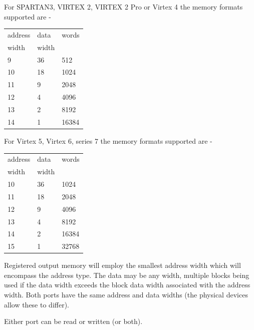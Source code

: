                 For SPARTAN3, VIRTEX 2, VIRTEX 2 Pro or Virtex 4 the memory formats
                supported are -

                \begin{tabular}{| l | l | l |}
                \hline
                address & data & words\\
                width & width & \\
                \hline \hline
                9  & 36 & 512   \\ \hline
                10 & 18 & 1024  \\ \hline
                11 & 9  & 2048  \\ \hline
                12 & 4  & 4096  \\ \hline
                13 & 2  & 8192  \\ \hline
                14 & 1  & 16384 \\ \hline
                \end{tabular}

                For Virtex 5, Virtex 6, series 7 the memory formats supported are -

                \begin{tabular}{| l | l | l |}
                \hline
                address & data & words\\
                width & width & \\
                \hline \hline
                10 & 36 & 1024  \\ \hline
                11 & 18 & 2048  \\ \hline
                12 & 9  & 4096  \\ \hline
                13 & 4  & 8192  \\ \hline
                14 & 2  & 16384 \\ \hline
                15 & 1  & 32768 \\ \hline
                \end{tabular}

                Registered output memory will employ the smallest address width
                which will encompass the address type. The data may be any
                width, multiple blocks being used if the data width exceeds the
                block data width associated with the address width. Both ports
                have the same address and data widths (the physical devices
                allow these to differ).

                Either port can be read or written (or both).













